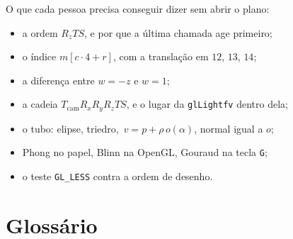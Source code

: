 \documentclass[11pt,a4paper]{article}
\newcommand{\fn}[1]{\texttt{\nobreak\hspace{0pt}#1}}
\begin{document}
O que cada pessoa precisa conseguir dizer sem abrir o plano:

\begin{itemize}
\item a ordem \(R_z T S\), e por que a última chamada age primeiro;
\item o índice \(m[c\cdot 4 + r]\), com a translação em \(12\), \(13\), \(14\);
\item a diferença entre \(w = -z\) e \(w = 1\);
\item a cadeia \(T_{\mathrm{cam}} R_x R_y R_z T S\), e o lugar da \fn{glLightfv} dentro dela;
\item o tubo: elipse, triedro, \(\,v = p + \rho\, o(\alpha)\), normal igual a \(o\);
\item Phong no papel, Blinn na OpenGL, Gouraud na tecla \fn{G};
\item o teste \fn{GL\_LESS} contra a ordem de desenho.
\end{itemize}

\section{Glossário}
\end{document}
